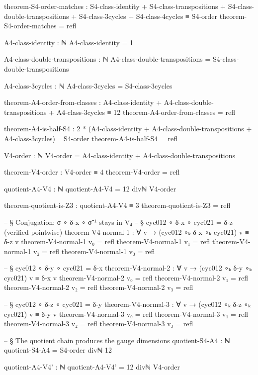 \documentclass[11pt,a4paper]{book}
\begin{document}
\begin{code}
theorem-S4-order-matches : S4-class-identity 
                         + S4-class-transpositions 
                         + S4-class-double-transpositions 
                         + S4-class-3cycles 
                         + S4-class-4cycles ≡ S4-order
theorem-S4-order-matches = refl

A4-class-identity : ℕ
A4-class-identity = 1

A4-class-double-transpositions : ℕ
A4-class-double-transpositions = S4-class-double-transpositions

A4-class-3cycles : ℕ
A4-class-3cycles = S4-class-3cycles

theorem-A4-order-from-classes : A4-class-identity 
                              + A4-class-double-transpositions 
                              + A4-class-3cycles ≡ 12
theorem-A4-order-from-classes = refl

theorem-A4-is-half-S4 : 2 * (A4-class-identity 
                            + A4-class-double-transpositions 
                            + A4-class-3cycles) ≡ S4-order
theorem-A4-is-half-S4 = refl

V4-order : ℕ
V4-order = A4-class-identity + A4-class-double-transpositions

theorem-V4-order : V4-order ≡ 4
theorem-V4-order = refl

quotient-A4-V4 : ℕ
quotient-A4-V4 = 12 divℕ V4-order

theorem-quotient-is-Z3 : quotient-A4-V4 ≡ 3
theorem-quotient-is-Z3 = refl

-- § Conjugation: σ ∘ δ-x ∘ σ⁻¹ stays in V₄
-- § cyc012 ∘ δ-x ∘ cyc021 = δ-z  (verified pointwise)
theorem-V4-normal-1 : ∀ v → (cyc012 ∘ₖ δ-x ∘ₖ cyc021) v ≡ δ-z v
theorem-V4-normal-1 v₀ = refl
theorem-V4-normal-1 v₁ = refl
theorem-V4-normal-1 v₂ = refl
theorem-V4-normal-1 v₃ = refl

-- § cyc012 ∘ δ-y ∘ cyc021 = δ-x
theorem-V4-normal-2 : ∀ v → (cyc012 ∘ₖ δ-y ∘ₖ cyc021) v ≡ δ-x v
theorem-V4-normal-2 v₀ = refl
theorem-V4-normal-2 v₁ = refl
theorem-V4-normal-2 v₂ = refl
theorem-V4-normal-2 v₃ = refl

-- § cyc012 ∘ δ-z ∘ cyc021 = δ-y
theorem-V4-normal-3 : ∀ v → (cyc012 ∘ₖ δ-z ∘ₖ cyc021) v ≡ δ-y v
theorem-V4-normal-3 v₀ = refl
theorem-V4-normal-3 v₁ = refl
theorem-V4-normal-3 v₂ = refl
theorem-V4-normal-3 v₃ = refl

-- § The quotient chain produces the gauge dimensions
quotient-S4-A4 : ℕ
quotient-S4-A4 = S4-order divℕ 12

quotient-A4-V4' : ℕ
quotient-A4-V4' = 12 divℕ V4-order


\end{code}
\end{document}
